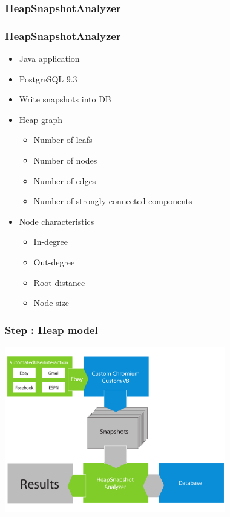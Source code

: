 \documentclass[xcolor=x11names,compress]{beamer}
\begin{document}
	\subsubsection{HeapSnapshotAnalyzer}
	\begin{frame}
		\frametitle{HeapSnapshotAnalyzer}
		\begin{itemize}
			\item Java application
			\item PostgreSQL 9.3
			\item Write snapshots into DB
			
			\pause
			
			\item Heap graph
			\begin{itemize}
				 \item Number of leafs
				 \item Number of nodes
				 \item Number of edges
				 \item Number of strongly connected components
			\end{itemize}
			
			\pause 
			
			\item Node characteristics
			\begin{itemize} 
				 \item In-degree
				 \item Out-degree
				 \item Root distance
				 \item Node size 
			\end{itemize}
		\end{itemize} 
	\end{frame}
	
	\begin{frame}
		\frametitle{Step \theStepCounter: Heap model}		
		\includegraphics[width=26em]{./imgs/solution_h.pdf}
	\end{frame}
	
\end{document}
